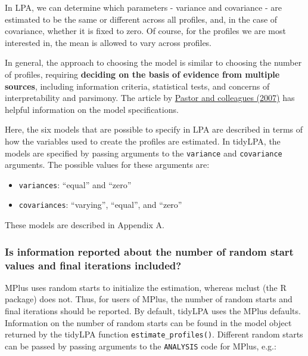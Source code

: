 \documentclass[man]{apa6}
\providecommand{\tightlist}{%
  \setlength{\itemsep}{0pt}\setlength{\parskip}{0pt}}
\begin{document}
In LPA, we can determine which parameters - variance and covariance - are
estimated to be the same or different across all profiles, and, in the case of
covariance, whether it is fixed to zero. Of course, for the profiles we are most
interested in, the mean is allowed to vary across profiles.

In general, the approach to choosing the model is similar to choosing the number
of profiles, requiring \textbf{deciding on the basis of evidence from multiple
sources}, including information criteria, statistical tests, and concerns of
interpretability and parsimony. The article by \href{https://www.sciencedirect.com/science/article/pii/S0361476X06000543}{Pastor and colleagues
(2007)} has
helpful information on the model specifications.

Here, the six models that are possible to specify in LPA are described in terms of how the variables used to create the profiles are estimated. In tidyLPA, the models are specified by passing
arguments to the \texttt{variance} and \texttt{covariance} arguments. The possible values for
these arguments are:

\begin{itemize}
\tightlist
\item
  \texttt{variances}: \enquote{equal} and \enquote{zero}
\item
  \texttt{covariances}: \enquote{varying}, \enquote{equal}, and \enquote{zero}
\end{itemize}

These models are described in Appendix A.

\hypertarget{is-information-reported-about-the-number-of-random-start-values-and-final-iterations-included}{%
\subsubsection{Is information reported about the number of random start values and final iterations included?}\label{is-information-reported-about-the-number-of-random-start-values-and-final-iterations-included}}

MPlus uses random starts to initialize the estimation, whereas mclust (the R package) does not. Thus, for users of MPlus, the number of random starts and final iterations should be reported. By default, tidyLPA uses the MPlus defaults. Information on the number of random starts can be found in the model object returned by the tidyLPA function \texttt{estimate\_profiles()}. Different random starts can be passed by passing arguments to the \texttt{ANALYSIS} code for MPlus, e.g.:
\end{document}
